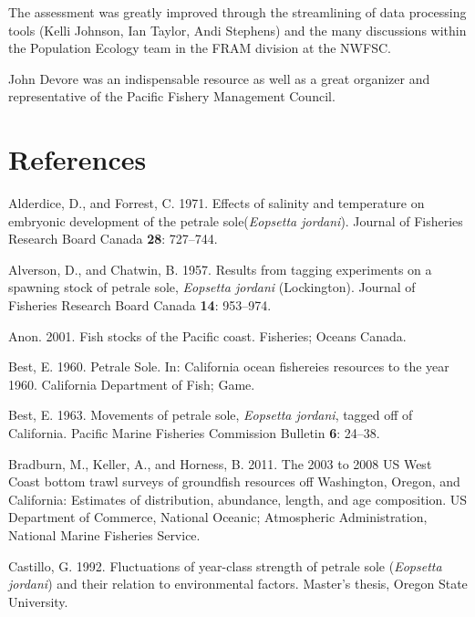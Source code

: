 \documentclass[12pt,]{article}
\begin{document}
The assessment was greatly improved through the streamlining of data
processing tools (Kelli Johnson, Ian Taylor, Andi Stephens) and the many
discussions within the Population Ecology team in the FRAM division at
the NWFSC.

John Devore was an indispensable resource as well as a great organizer
and representative of the Pacific Fishery Management Council.

\newpage

\FloatBarrier

\section{References}\label{references}

\color{black}

\hypertarget{refs}{}
\hypertarget{ref-alderdice_effects_1971}{}
Alderdice, D., and Forrest, C. 1971. Effects of salinity and temperature
on embryonic development of the petrale sole(\emph{Eopsetta jordani}).
Journal of Fisheries Research Board Canada \textbf{28}: 727--744.

\hypertarget{ref-alverson_results_1957}{}
Alverson, D., and Chatwin, B. 1957. Results from tagging experiments on
a spawning stock of petrale sole, \emph{Eopsetta jordani} (Lockington).
Journal of Fisheries Research Board Canada \textbf{14}: 953--974.

\hypertarget{ref-anon_fish_2001}{}
Anon. 2001. Fish stocks of the Pacific coast. Fisheries; Oceans Canada.

\hypertarget{ref-best_petrale_1960}{}
Best, E. 1960. Petrale Sole. In: California ocean fishereies resources
to the year 1960. California Department of Fish; Game.

\hypertarget{ref-best_e.a._movements_1963}{}
Best, E. 1963. Movements of petrale sole, \emph{Eopsetta jordani},
tagged off of California. Pacific Marine Fisheries Commission Bulletin
\textbf{6}: 24--38.

\hypertarget{ref-bradburn_2003_2011}{}
Bradburn, M., Keller, A., and Horness, B. 2011. The 2003 to 2008 US West
Coast bottom trawl surveys of groundfish resources off Washington,
Oregon, and California: Estimates of distribution, abundance, length,
and age composition. US Department of Commerce, National Oceanic;
Atmospheric Administration, National Marine Fisheries Service.

\hypertarget{ref-castillo_g.c._fluctuations_1992}{}
Castillo, G. 1992. Fluctuations of year-class strength of petrale sole
(\emph{Eopsetta jordani}) and their relation to environmental factors.
Master's thesis, Oregon State University.
\end{document}
